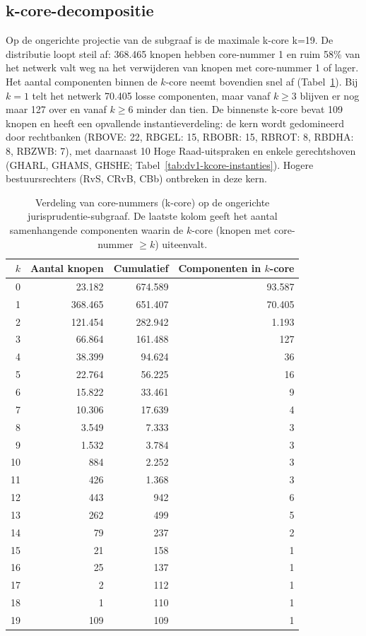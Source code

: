 \documentclass[a4paper, 12pt]{report}
\begin{document}
\subsection{k-core-decompositie} Op de ongerichte projectie van de subgraaf is de maximale k-core k=19. De distributie loopt steil af: 368.465 knopen hebben core-nummer 1 en ruim 58\% van het netwerk valt weg na het verwijderen van knopen met core-nummer 1 of lager. Het aantal componenten binnen de $k$-core neemt bovendien snel af (Tabel~\ref{tab:dv1-kcore-dist}). Bij $k = 1$ telt het netwerk 70.405 losse componenten, maar vanaf $k \geq 3$ blijven er nog maar 127 over en vanaf $k \geq 6$ minder dan tien. De binnenste k-core bevat 109 knopen en heeft een opvallende instantieverdeling: de kern wordt gedomineerd door rechtbanken (RBOVE: 22, RBGEL: 15, RBOBR: 15, RBROT: 8, RBDHA: 8, RBZWB: 7), met daarnaast 10 Hoge Raad-uitspraken en enkele gerechtshoven (GHARL, GHAMS, GHSHE; Tabel~\ref{tab:dv1-kcore-instanties}). Hogere bestuursrechters (RvS, CRvB, CBb) ontbreken in deze kern.



\begin{table}[H]
  \centering
  \caption{Verdeling van core-nummers (k-core) op de ongerichte jurisprudentie-subgraaf. De laatste kolom geeft het aantal samenhangende componenten waarin de $k$-core (knopen met core-nummer $\geq k$) uiteenvalt.}
  \label{tab:dv1-kcore-dist}
  \begin{tabular}{rrrr}
    \toprule
    $k$ & Aantal knopen & Cumulatief & Componenten in $k$-core \\
    \midrule
    0  & 23.182  & 674.589 & 93.587 \\
    1  & 368.465 & 651.407 & 70.405 \\
    2  & 121.454 & 282.942 & 1.193 \\
    3  & 66.864  & 161.488 & 127 \\
    4  & 38.399  & 94.624  & 36 \\
    5  & 22.764  & 56.225  & 16 \\
    6  & 15.822  & 33.461  & 9 \\
    7  & 10.306  & 17.639  & 4 \\
    8  & 3.549   & 7.333   & 3 \\
    9  & 1.532   & 3.784   & 3 \\
    10 & 884     & 2.252   & 3 \\
    11 & 426     & 1.368   & 3 \\
    12 & 443     & 942     & 6 \\
    13 & 262     & 499     & 5 \\
    14 & 79      & 237     & 2 \\
    15 & 21      & 158     & 1 \\
    16 & 25      & 137     & 1 \\
    17 & 2       & 112     & 1 \\
    18 & 1       & 110     & 1 \\
    19 & 109     & 109     & 1 \\
    \bottomrule
  \end{tabular}
\end{table}
\end{document}
